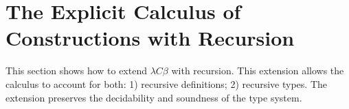 \section{The Explicit Calculus of Constructions with Recursion}

This section shows how to extend $\lambda C\beta$ with recursion. This extension 
allows the calculus to account for both: 1) recursive definitions; 2) recursive types. 
The extension preserves the decidability and soundness of the type system.


